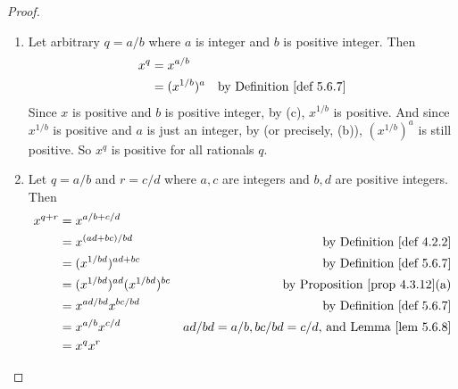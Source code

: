 \begin{proof}
\begin{enumerate}
\item
    Let arbitrary \(q = a/b\) where \(a\) is integer and \(b\) is positive integer.
    Then
    \begin{align*}
        x^q & = x^{a/b} \\
            & = (x^{1/b})^a & \text{by \DEF{5.6.7}}
    \end{align*}
    Since \(x\) is positive and \(b\) is positive integer, by (c), \(x^{1/b}\) is positive.
    And since \(x^{1/b}\) is positive and \(a\) is just an integer, by (or precisely, (b)), \((x^{1/b})^a\) is still positive.
    So \(x^q\) is positive for all rationals \(q\).
\item
    Let \(q = a / b\) and \(r = c / d\) where \(a, c\) are integers and \(b, d\) are positive integers.
    Then
    \begin{align*}
        x^{q + r} & = x^{a/b + c/d} \\
                  & = x^{(ad + bc)/bd} & \text{by \DEF{4.2.2}} \\
                  & = (x^{1/bd})^{ad + bc} & \text{by \DEF{5.6.7}} \\
                  & = (x^{1/bd})^{ad} (x^{1/bd})^{bc} & \text{by \PROP{4.3.12}(a)} \\
                  & = x^{ad/bd} x^{bc/bd} & \text{by \DEF{5.6.7}} \\
                  & = x^{a/b} x^{c/d} & \text{\(ad/bd = a/b, bc/bd = c/d\), and \LEM{5.6.8}} \\
                  & = x^q x^r
    \end{align*}


\end{enumerate}
\end{proof}
